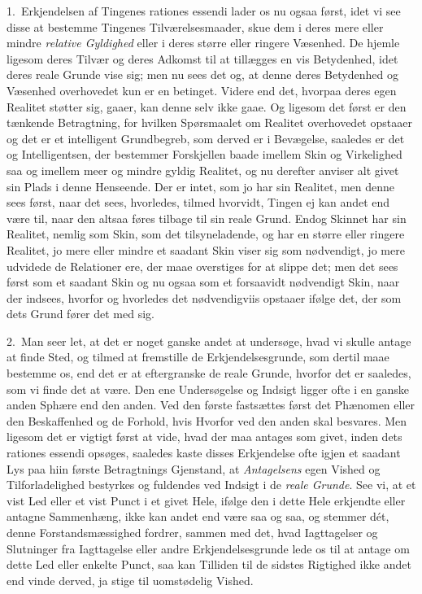 \documentclass[12pt,a4paper]{book}
\newcommand{\apage}[1]{\marginnote{\footnotesize\textit{[#1]}}}
\begin{document}
1.~Erkjendelsen af Tingenes rationes essendi lader os nu ogsaa først, idet vi see
disse at bestemme Tingenes Tilværelsesmaader, skue dem i deres mere eller mindre
\emph{relative Gyldighed} eller i deres større eller ringere Væsenhed. De hjemle
ligesom deres Tilvær og deres Adkomst til at tillægges en vis Betydenhed, idet
deres reale Grunde vise sig; men nu sees det og, at denne deres Betydenhed og
Væsenhed overhovedet kun er en betinget. Videre end det, hvorpaa deres egen
Realitet støtter sig, gaaer, kan denne selv ikke gaae. Og ligesom det først er
den tænkende Betragtning, for hvilken Spørsmaalet om Realitet overhovedet opstaaer
og det er et intelligent Grundbegreb, som derved er i Bevægelse, saaledes er det
og Intelligentsen, der bestemmer Forskjellen baade imellem Skin og Virkelighed
saa og imellem meer og mindre gyldig Realitet, og nu derefter anviser alt givet
sin Plads i denne Henseende. Der er intet, som jo har sin Realitet, men denne
sees først, naar det sees, hvorledes, tilmed hvorvidt, Tingen ej kan andet end
være til, naar den altsaa føres tilbage til sin reale Grund. Endog Skinnet har
sin Realitet, nemlig som Skin, som det tilsyneladende, og har en større eller
ringere \apage{75}  Realitet, jo mere eller mindre et saadant Skin viser sig som nødvendigt,
jo mere udvidede de Relationer ere, der maae overstiges for at slippe det; men
det sees først som et saadant Skin og nu ogsaa som et forsaavidt nødvendigt Skin,
naar der indsees, hvorfor og hvorledes det nødvendigviis opstaaer ifølge det, der
som dets Grund fører det med sig.

2.~Man seer let, at det er noget ganske andet at undersøge, hvad vi skulle antage
at finde Sted, og tilmed at fremstille de Erkjendelsesgrunde, som dertil maae
bestemme os, end det er at eftergranske de reale Grunde, hvorfor det er saaledes,
som vi finde det at være. Den ene Undersøgelse og Indsigt ligger ofte i en ganske
anden Sphære end den anden. Ved den første fastsættes først det Phænomen eller
den Beskaffenhed og de Forhold, hvis Hvorfor ved den anden skal besvares. Men
ligesom det er vigtigt først at vide, hvad der maa antages som givet, inden dets
rationes essendi opsøges, saaledes kaste disses Erkjendelse ofte igjen et saadant
Lys paa hiin første Betragtnings Gjenstand, at \emph{Antagelsens} egen Vished og
Tilforladelighed bestyrkes og fuldendes ved Indsigt i de \emph{reale Grunde}. See
vi, at et vist Led eller et vist Punct i et givet Hele, ifølge den i dette Hele
erkjendte eller antagne Sammenhæng, ikke kan andet end være saa og saa, og
stemmer dét, denne Forstandsmæssighed fordrer, \apage{76} sammen med det, hvad Iagttagelser
og Slutninger fra Iagttagelse eller andre Erkjendelsesgrunde lede os til at antage
om dette Led eller enkelte Punct, saa kan Tilliden til de sidstes Rigtighed ikke
andet end vinde derved, ja stige til uomstødelig Vished.
\end{document}
